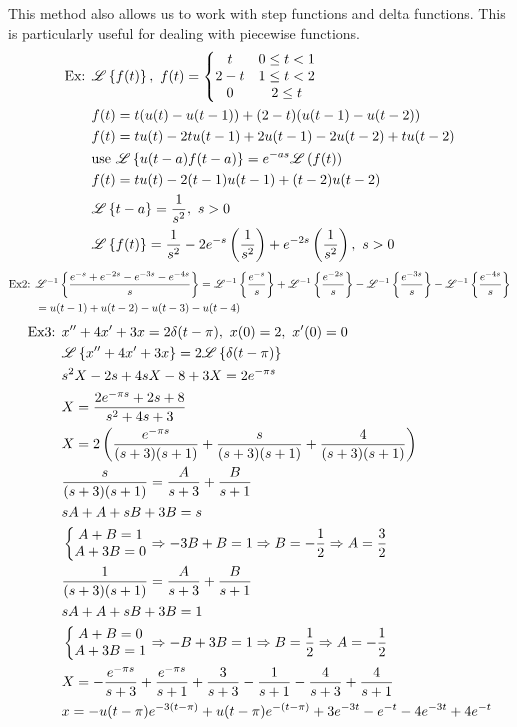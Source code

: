 \documentclass[11pt, fleqn]{article}
\begin{document}
This method also allows us to work with step functions and delta functions. This is particularly useful for dealing with piecewise functions.\\
\begin{align*}
    \text{Ex: }&\lap\brcurly{f(t)},\ f(t)=\eqnsystem{t&0\leq t<1\\2-t&1\leq t<2\\0&2\leq t}\\
    &f(t)=t(u(t)-u(t-1))+(2-t)(u(t-1)-u(t-2))\\
    &f(t)=tu(t)-2tu(t-1)+2u(t-1)-2u(t-2)+tu(t-2)\\
    &\text{use }\lap\brcurly{u(t-a)f(t-a)}=e^{-as}\lap\brround{f(t)}\\
    &f(t)=tu(t)-2(t-1)u(t-1)+(t-2)u(t-2)\\
    &\lap\brcurly{t-a}=\frac{1}{s^2},\ s>0\\
    &\lap\brcurly{f(t)}=\frac{1}{s^2}-2e^{-s}\brround{\frac{1}{s^2}}+e^{-2s}\brround{\frac{1}{s^2}},\ s>0
\end{align*}
\begin{align*}
    \text{Ex2: }&\mathscr{L}^{-1}\left\{ \frac{e^{-s}+e^{-2s}-e^{-3s}-e^{-4s}}{s} \right\}=\mathscr{L}^{-1}\left\{ \frac{e^{-s}}{s} \right\}+\mathscr{L}^{-1}\left\{ \frac{e^{-2s}}{s} \right\}-\mathscr{L}^{-1}\left\{ \frac{e^{-3s}}{s} \right\}-\mathscr{L}^{-1}\left\{ \frac{e^{-4s}}{s} \right\}\\
    &=u(t-1)+u(t-2)-u(t-3)-u(t-4)
\end{align*}
\begin{align*}
    \text{Ex3: }&x''+4x'+3x=2\delta(t-\pi),\ x(0)=2,\ x'(0)=0\\
    &\mathscr{L}\left\{ x''+4x'+3x \right\}=2\mathscr{L}\left\{ \delta(t-\pi) \right\}\\
    &s^2X-2s+4sX-8+3X=2e^{-\pi s}\\
    &X=\frac{2e^{-\pi s}+2s+8}{s^2+4s+3}\\
    &X=2\left( \frac{e^{-\pi s}}{(s+3)(s+1)}+\frac{s}{(s+3)(s+1)}+\frac{4}{(s+3)(s+1)} \right)\\
    &\frac{s}{(s+3)(s+1)}=\frac{A}{s+3}+\frac{B}{s+1}\\
    &sA+A+sB+3B=s\\
    &\left\{\begin{matrix} A+B=1\\A+3B=0 \end{matrix}\right.\Rightarrow -3B+B=1\Rightarrow B=-\frac{1}{2}\Rightarrow A=\frac{3}{2}\\
    &\frac{1}{(s+3)(s+1)}=\frac{A}{s+3}+\frac{B}{s+1}\\
    &sA+A+sB+3B=1\\
    &\left\{\begin{matrix} A+B=0\\A+3B=1 \end{matrix}\right.\Rightarrow -B+3B=1\Rightarrow B=\frac{1}{2}\Rightarrow A=-\frac{1}{2}\\
    &X=-\frac{e^{-\pi s}}{s+3}+\frac{e^{-\pi s}}{s+1}+\frac{3}{s+3}-\frac{1}{s+1}-\frac{4}{s+3}+\frac{4}{s+1}\\
    &x=-u(t-\pi)e^{-3(t-\pi)}+u(t-\pi)e^{-(t-\pi)}+3e^{-3t}-e^{-t}-4e^{-3t}+4e^{-t}
\end{align*}
\end{document}
